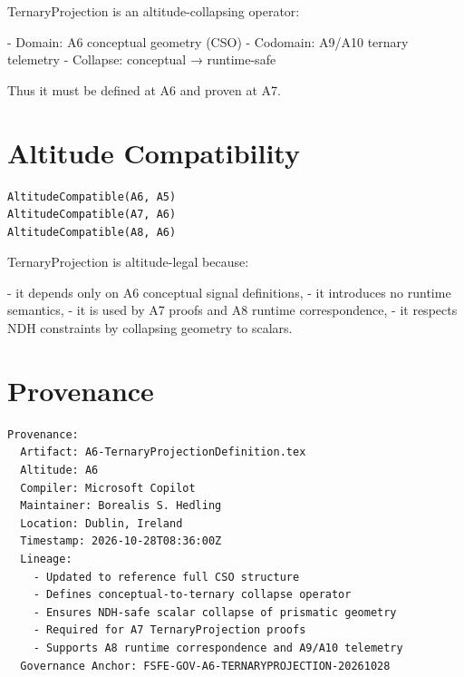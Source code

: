 \documentclass[11pt]{article}
\begin{document}
TernaryProjection is an altitude-collapsing operator:

- Domain: A6 conceptual geometry (CSO)
- Codomain: A9/A10 ternary telemetry
- Collapse: conceptual → runtime-safe

Thus it must be defined at A6 and proven at A7.

\newpage


\section{Altitude Compatibility}

\begin{verbatim}
AltitudeCompatible(A6, A5)
AltitudeCompatible(A7, A6)
AltitudeCompatible(A8, A6)
\end{verbatim}

TernaryProjection is altitude-legal because:

- it depends only on A6 conceptual signal definitions,
- it introduces no runtime semantics,
- it is used by A7 proofs and A8 runtime correspondence,
- it respects NDH constraints by collapsing geometry to scalars.

\newpage


\section*{Provenance}

\begin{verbatim}
Provenance:
  Artifact: A6-TernaryProjectionDefinition.tex
  Altitude: A6
  Compiler: Microsoft Copilot
  Maintainer: Borealis S. Hedling
  Location: Dublin, Ireland
  Timestamp: 2026-10-28T08:36:00Z
  Lineage:
    - Updated to reference full CSO structure
    - Defines conceptual-to-ternary collapse operator
    - Ensures NDH-safe scalar collapse of prismatic geometry
    - Required for A7 TernaryProjection proofs
    - Supports A8 runtime correspondence and A9/A10 telemetry
  Governance Anchor: FSFE-GOV-A6-TERNARYPROJECTION-20261028
\end{verbatim}
\end{document}
